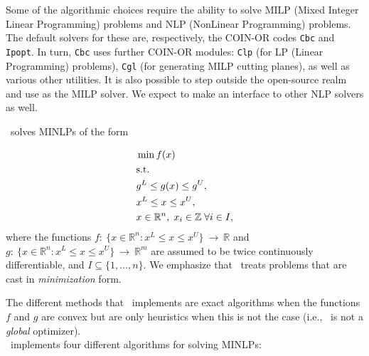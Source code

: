 Some of the algorithmic choices require the ability to solve MILP
(Mixed Integer Linear Programming) problems and NLP (NonLinear
Programming) problems. The default solvers for these are,
respectively, the COIN-OR codes {\tt Cbc} and {\tt Ipopt}. In turn,
{\tt Cbc} uses further COIN-OR modules: {\tt Clp} (for LP (Linear
Programming) problems), {\tt Cgl} (for generating MILP cutting
planes), as well as various other utilities. It is also possible to
step outside the open-source realm and use
as the MILP solver. We expect to make an interface to other NLP solvers as well.

\Bonmin\ solves MINLPs of the form

\begin{align*}
&\min f(x) \\
& {\rm s.t.} \\
&g^L \leq g(x) \leq g^U,\\
& x^L \leq x \leq x^U, \\
&x \in \mathbb{R}^n, \;  x_i \in \mathbb{Z} \; \forall i \in I,
\end{align*}
where the functions $f :~\{x\in \mathbb{R}^n : x^L \leq x \leq x^U
\}~ \rightarrow~\mathbb{R}$ and $g:~\{x\in \mathbb{R}^n : x^L \leq x
\leq x^U \}~\rightarrow~\mathbb{R}^m$ are assumed to be twice
continuously differentiable, and $I \subseteq \{1, \ldots,n \}$. We
emphasize that \Bonmin\ treats problems that are cast
in {\em minimization} form.

The different methods that \Bonmin\ implements are exact algorithms when the functions $f$ and $g$ are
convex but are only heuristics when this is not the case (i.e., \Bonmin\ is not a \emph{global} optimizer).\\

\Bonmin\ implements four different algorithms for solving
MINLPs:

